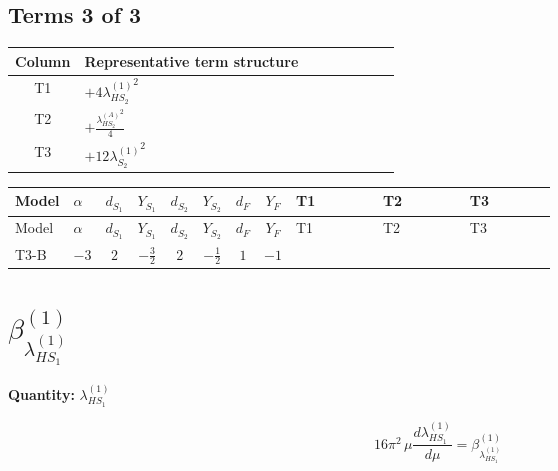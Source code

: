 \documentclass[8pt]{article}
\begin{document}
\begin{landscape}
\subsection*{Terms 3 of 3}
\begin{center}
\begin{tabular}{@{}c >{\raggedright\arraybackslash}p{0.82\linewidth}@{}}
\toprule
Column & Representative term structure \\
\midrule
T1 & \(\displaystyle +4 {\lambda_{HS_2}^{(1)}}^2\) \\
\midrule
T2 & \(\displaystyle +\frac{{\lambda_{HS_2}^{(A)}}^2}{4}\) \\
\midrule
T3 & \(\displaystyle +12 {\lambda_{S_2}^{(1)}}^2\) \\
\midrule
\bottomrule
\end{tabular}
\end{center}
\smallskip
\tiny
\begin{longtable}{@{}llcccccc >{\raggedright\arraybackslash}p{0.21\linewidth} >{\raggedright\arraybackslash}p{0.21\linewidth} >{\raggedright\arraybackslash}p{0.21\linewidth}@{}}
\toprule
Model & $\alpha$ & $d_{S_1}$ & $Y_{S_1}$ & $d_{S_2}$ & $Y_{S_2}$ & $d_F$ & $Y_F$ & T1 & T2 & T3 \\
\midrule
\endfirsthead
\toprule
Model & $\alpha$ & $d_{S_1}$ & $Y_{S_1}$ & $d_{S_2}$ & $Y_{S_2}$ & $d_F$ & $Y_F$ & T1 & T2 & T3 \\
\midrule
\endhead
T3-B & $-3$ & $2$ & $-\frac{3}{2}$ & $2$ & $-\frac{1}{2}$ & $1$ & $-1$ & \scriptsize\adjustbox{max width=\linewidth}{$\begin{gathered} +4 {\lambda_{HS_2}^{(1)}}^2\end{gathered}$} & \scriptsize\adjustbox{max width=\linewidth}{$\begin{gathered} +\frac{{\lambda_{HS_2}^{(A)}}^2}{4}\end{gathered}$} & \scriptsize\adjustbox{max width=\linewidth}{$\begin{gathered} +12 {\lambda_{S_2}^{(1)}}^2\end{gathered}$} \\
\midrule
\bottomrule
\end{longtable}
\clearpage
\section*{$\beta_{\lambda_{HS_1}^{(1)}}^{(1)}$}
\noindent\textbf{Quantity: }$\lambda_{HS_1}^{(1)}$\par\smallskip
\[16\pi^2\,\mu\frac{d \lambda_{HS_1}^{(1)}}{d\mu}=\beta_{\lambda_{HS_1}^{(1)}}^{(1)}\]

\end{landscape}
\end{document}
